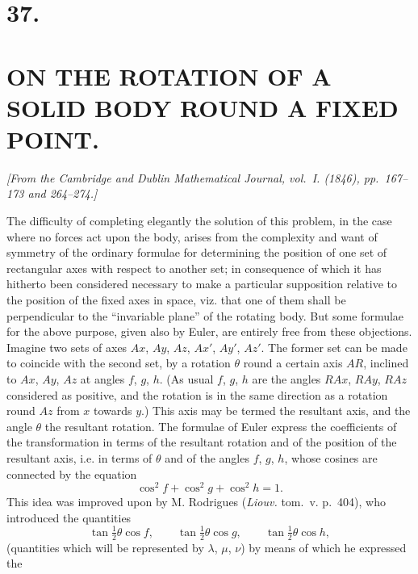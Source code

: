 \documentclass[11pt]{article}
\begin{document}
\newpage
\section*{37.}
\section*{ON THE ROTATION OF A SOLID BODY ROUND A FIXED POINT.}
\setcounter{page}{237}

\textit{[From the Cambridge and Dublin Mathematical Journal, vol.~I. (1846), pp.~167--173
and 264--274.]}

\bigskip

The difficulty of completing elegantly the solution of this problem, in the case where
no forces act upon the body, arises from the complexity and want of symmetry of the
ordinary formulae for determining the position of one set of rectangular axes with
respect to another set; in consequence of which it has hitherto been considered
necessary to make a particular supposition relative to the position of the fixed axes in
space, viz. that one of them shall be perpendicular to the ``invariable plane'' of the
rotating body. But some formulae for the above purpose, given also by Euler, are
entirely free from these objections. Imagine two sets of axes $Ax$, $Ay$, $Az$, $Ax'$,
$Ay'$, $Az'$. The former set can be made to coincide with the second set, by a rotation
$\theta$ round a certain axis $AR$, inclined to $Ax$, $Ay$, $Az$ at angles $f$, $g$, $h$.
(As usual $f$, $g$, $h$ are the angles $RAx$, $RAy$, $RAz$ considered as positive, and
the rotation is in the same direction as a rotation round $Az$ from $x$ towards $y$.)
This axis may be termed the resultant axis, and the angle $\theta$ the resultant
rotation. The formulae of Euler express the coefficients of the transformation in terms
of the resultant rotation and of the position of the resultant axis, i.e. in terms of
$\theta$ and of the angles $f$, $g$, $h$, whose cosines are connected by the equation
\[
\cos^2 f+\cos^2 g+\cos^2 h=1.
\]
This idea was improved upon by M. Rodrigues (\textit{Liouv.} tom.~v. p.~404), who
introduced the quantities
\[
\tan\tfrac12\theta\cos f,\qquad
\tan\tfrac12\theta\cos g,\qquad
\tan\tfrac12\theta\cos h,
\]
(quantities which will be represented by $\lambda$, $\mu$, $\nu$) by means of which he
expressed the
\end{document}
